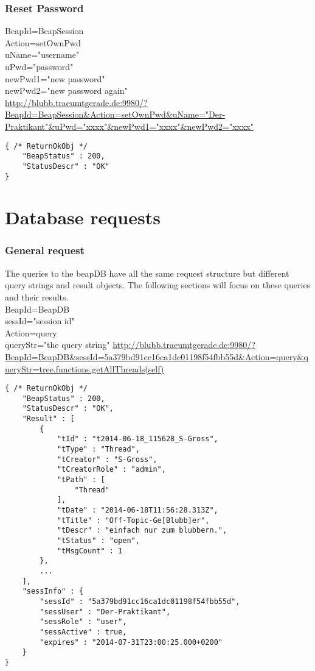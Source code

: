 \documentclass[12pt,a4paper,oneside]{report}
\begin{document}
\subsubsection{Reset Password}

BeapId=BeapSession\\
Action=setOwnPwd\\
uName="username"\\
uPwd="password"\\
newPwd1="new password"\\
newPwd2="new password again"\\
\url{http://blubb.traeumtgerade.de:9980/?BeapId=BeapSession&Action=setOwnPwd&uName="Der-Praktikant"&uPwd="xxxx"&newPwd1="xxxx"&newPwd2="xxxx"}
\lstset{language=JavaScript}
\begin{lstlisting}
{ /* ReturnOkObj */
    "BeapStatus" : 200,
    "StatusDescr" : "OK"
}
\end{lstlisting}

\section{Database requests}
\subsubsection{General request}
The queries to the beapDB have all the same request structure but different query strings and result objects. The following sections will focus on these queries and their results.
\\
BeapId=BeapDB\\
sessId="session id"\\
Action=query\\
queryStr="the query string"
\url{http://blubb.traeumtgerade.de:9980/?BeapId=BeapDB&sessId=5a379bd91cc16ca1dc01198f54fbb55d&Action=query&queryStr=tree.functions.getAllThreads(self)}

\begin{lstlisting}
{ /* ReturnOkObj */
    "BeapStatus" : 200,
    "StatusDescr" : "OK",
    "Result" : [  
        { 
            "tId" : "t2014-06-18_115628_S-Gross",
            "tType" : "Thread",
            "tCreator" : "S-Gross",
            "tCreatorRole" : "admin",
            "tPath" : [  
                "Thread"
            ],
            "tDate" : "2014-06-18T11:56:28.313Z",
            "tTitle" : "Off-Topic-Ge[Blubb]er",
            "tDescr" : "einfach nur zum blubbern.",
            "tStatus" : "open",
            "tMsgCount" : 1
        },
        ...
    ],
    "sessInfo" : { 
        "sessId" : "5a379bd91cc16ca1dc01198f54fbb55d",
        "sessUser" : "Der-Praktikant",
        "sessRole" : "user",
        "sessActive" : true,
        "expires" : "2014-07-31T23:00:25.000+0200"
    }
}
\end{lstlisting}
\end{document}
